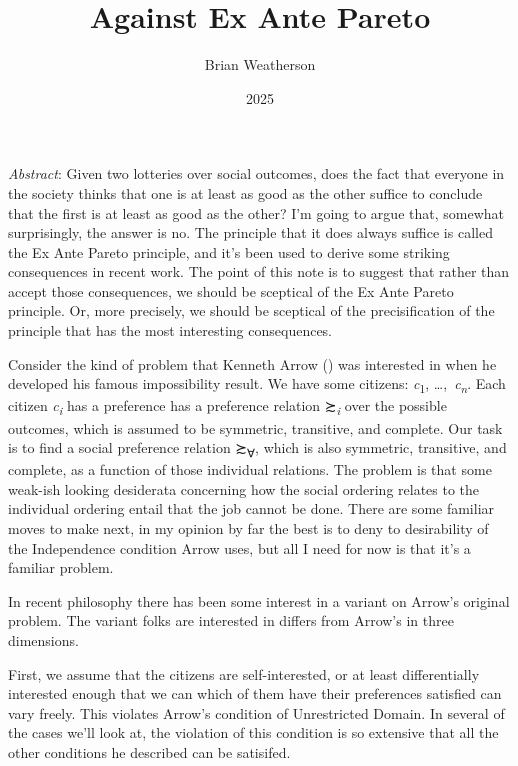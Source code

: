 \documentclass[
  11pt,
  letterpaper,
  DIV=11,
  numbers=noendperiod,
  twoside]{scrartcl}
\title{Against Ex Ante Pareto}
\author{Brian Weatherson}
\date{2025}
\renewenvironment{abstract}
 {\vspace{-1.25cm}
 \quotation\small\noindent\emph{Abstract}:}
 {\endquotation}
\begin{document}
\maketitle
\begin{abstract}
Given two lotteries over social outcomes, does the fact that everyone in
the society thinks that one is at least as good as the other suffice to
conclude that the first is at least as good as the other? I'm going to
argue that, somewhat surprisingly, the answer is no. The principle that
it does always suffice is called the Ex Ante Pareto principle, and it's
been used to derive some striking consequences in recent work. The point
of this note is to suggest that rather than accept those consequences,
we should be sceptical of the Ex Ante Pareto principle. Or, more
precisely, we should be sceptical of the precisification of the
principle that has the most interesting consequences.
\end{abstract}


Consider the kind of problem that Kenneth Arrow
() was interested in when he developed his
famous impossibility result. We have some citizens:
\emph{c}\textsubscript{1}, \ldots,~\emph{c\textsubscript{n}}. Each
citizen \emph{c\textsubscript{i}} has a preference has a preference
relation ≿\textsubscript{\emph{i}} over the possible outcomes, which is
assumed to be symmetric, transitive, and complete. Our task is to find a
social preference relation ≿\textsubscript{∀}, which is also symmetric,
transitive, and complete, as a function of those individual relations.
The problem is that some weak-ish looking desiderata concerning how the
social ordering relates to the individual ordering entail that the job
cannot be done. There are some familiar moves to make next, in my
opinion by far the best is to deny to desirability of the Independence
condition Arrow uses, but all I need for now is that it's a familiar
problem.

In recent philosophy there has been some interest in a variant on
Arrow's original problem. The variant folks are interested in differs
from Arrow's in three dimensions.

First, we assume that the citizens are self-interested, or at least
differentially interested enough that we can which of them have their
preferences satisfied can vary freely. This violates Arrow's condition
of Unrestricted Domain. In several of the cases we'll look at, the
violation of this condition is so extensive that all the other
conditions he described can be satisifed.
\end{document}
